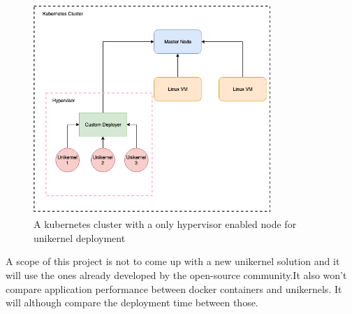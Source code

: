 \begin{figure}[htpb]
  \centering
  \includegraphics[width=0.8\textwidth]{figures/arch3.png}
  \caption{A kubernetes cluster with a only hypervisor enabled node for unikernel deployment} \label{fig:hypervisor}
\end{figure}


A scope of this project is not to come up with a new unikernel solution and it will use the ones already developed by the open-source community.It also won't compare application performance between docker containers and unikernels. It will although compare the deployment time between those.

